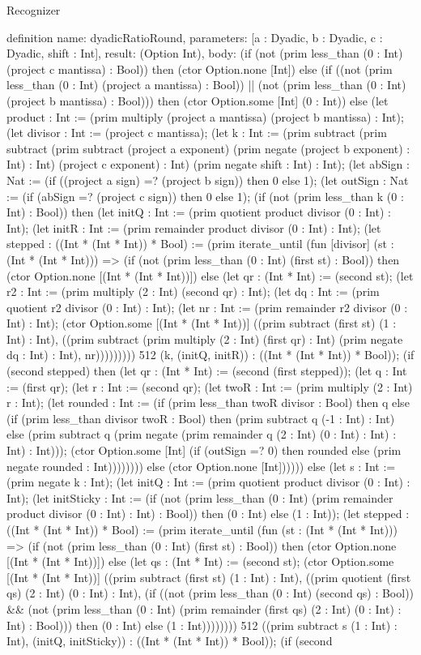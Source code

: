 \begin{lexlean}{Recognizer}
\begin{semanticmodule}
definition{
  name: dyadicRatioRound,
  parameters: [a : Dyadic, b : Dyadic, c : Dyadic, shift : Int],
  result: (Option Int),
  body: (if (not (prim less_than (0 : Int) (project c mantissa) : Bool)) then (ctor Option.none [Int]) else (if ((not (prim less_than (0 : Int) (project a mantissa) : Bool)) || (not (prim less_than (0 : Int) (project b mantissa) : Bool))) then (ctor Option.some [Int] (0 : Int)) else (let product : Int := (prim multiply (project a mantissa) (project b mantissa) : Int); (let divisor : Int := (project c mantissa); (let k : Int := (prim subtract (prim subtract (prim subtract (project a exponent) (prim negate (project b exponent) : Int) : Int) (project c exponent) : Int) (prim negate shift : Int) : Int); (let abSign : Nat := (if ((project a sign) =? (project b sign)) then 0 else 1); (let outSign : Nat := (if (abSign =? (project c sign)) then 0 else 1); (if (not (prim less_than k (0 : Int) : Bool)) then (let initQ : Int := (prim quotient product divisor (0 : Int) : Int); (let initR : Int := (prim remainder product divisor (0 : Int) : Int); (let stepped : ((Int * (Int * Int)) * Bool) := (prim iterate_until (fun [divisor] (st : (Int * (Int * Int))) => (if (not (prim less_than (0 : Int) (first st) : Bool)) then (ctor Option.none [(Int * (Int * Int))]) else (let qr : (Int * Int) := (second st); (let r2 : Int := (prim multiply (2 : Int) (second qr) : Int); (let dq : Int := (prim quotient r2 divisor (0 : Int) : Int); (let nr : Int := (prim remainder r2 divisor (0 : Int) : Int); (ctor Option.some [(Int * (Int * Int))] ((prim subtract (first st) (1 : Int) : Int), ((prim subtract (prim multiply (2 : Int) (first qr) : Int) (prim negate dq : Int) : Int), nr))))))))) 512 (k, (initQ, initR)) : ((Int * (Int * Int)) * Bool)); (if (second stepped) then (let qr : (Int * Int) := (second (first stepped)); (let q : Int := (first qr); (let r : Int := (second qr); (let twoR : Int := (prim multiply (2 : Int) r : Int); (let rounded : Int := (if (prim less_than twoR divisor : Bool) then q else (if (prim less_than divisor twoR : Bool) then (prim subtract q (-1 : Int) : Int) else (prim subtract q (prim negate (prim remainder q (2 : Int) (0 : Int) : Int) : Int) : Int))); (ctor Option.some [Int] (if (outSign =? 0) then rounded else (prim negate rounded : Int)))))))) else (ctor Option.none [Int]))))) else (let s : Int := (prim negate k : Int); (let initQ : Int := (prim quotient product divisor (0 : Int) : Int); (let initSticky : Int := (if (not (prim less_than (0 : Int) (prim remainder product divisor (0 : Int) : Int) : Bool)) then (0 : Int) else (1 : Int)); (let stepped : ((Int * (Int * Int)) * Bool) := (prim iterate_until (fun (st : (Int * (Int * Int))) => (if (not (prim less_than (0 : Int) (first st) : Bool)) then (ctor Option.none [(Int * (Int * Int))]) else (let qs : (Int * Int) := (second st); (ctor Option.some [(Int * (Int * Int))] ((prim subtract (first st) (1 : Int) : Int), ((prim quotient (first qs) (2 : Int) (0 : Int) : Int), (if ((not (prim less_than (0 : Int) (second qs) : Bool)) && (not (prim less_than (0 : Int) (prim remainder (first qs) (2 : Int) (0 : Int) : Int) : Bool))) then (0 : Int) else (1 : Int)))))))) 512 ((prim subtract s (1 : Int) : Int), (initQ, initSticky)) : ((Int * (Int * Int)) * Bool)); (if (second }
\end{semanticmodule}
\end{lexlean}

